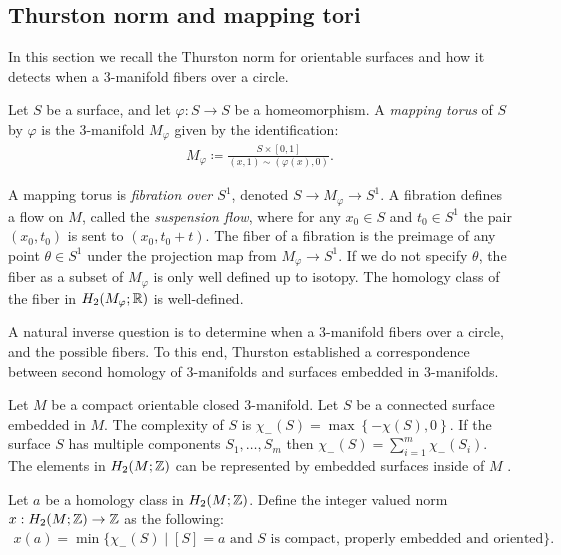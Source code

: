 \subsection{Thurston norm and mapping tori}
\label{sec:backgr-thurst-norm}
In this section we recall the Thurston norm for orientable surfaces and how it detects when a 3-manifold fibers over a circle.

 Let $S$ be a surface, and let $\varphi: S \to S$ be a homeomorphism.  A {\it mapping torus} of $S$ by $\varphi$ is the $3$-manifold $M_\varphi$ given by the identification:
\begin{align*}
  M_\varphi \coloneqq \frac{S \times [0,1]}{(x,1) \sim (\varphi(x), 0)}.
\end{align*}

A mapping torus is \emph{fibration over $S^1$}, denoted $S\rightarrow M_\varphi\rightarrow S^1$.
A fibration defines a flow on $M$, called the \emph{suspension flow}, where for any $x_0\in S$ and $t_0\in S^1$ the pair $(x_0,t_0)$ is sent to $(x_0,t_0+t)$.
The fiber of a fibration is the preimage of any point $\theta \in S^1$ under the projection map from $M_{\varphi} \to S^1$.
If we do not specify $\theta$, the fiber as a subset of $M_\varphi$ is only well defined up to isotopy.   The homology class of the fiber in $H_2(M_{\varphi}; \mathbb{R})$ is well-defined.

A natural inverse question is to determine when a 3-manifold fibers over a circle, and the possible fibers.  To this end, Thurston established a correspondence between second homology of 3-manifolds and surfaces embedded in 3-manifolds.

 Let $M$ be a compact orientable closed $3$-manifold.
Let $S$ be a connected surface embedded in $M$.  The complexity of $S$ is $\chi_-(S) = \max\left\{-\chi(S),0\right\}$.
If the surface $S$ has multiple components $S_1, \ldots, S_m$ then $\chi_-(S) = \displaystyle\sum_{i=1}^m\chi_-(S_i)$.
The elements in $H_2(M ; \mathbb{Z})$ can be represented by embedded surfaces inside of $M$ \cite[Lemma 1]{thurston1986norm}.


 Let $a$ be a homology class in $H_2(M; \mathbb{Z})$.  Define the integer valued norm $x:H_2(M;\mathbb{Z})\rightarrow \mathbb{Z}$ as the following:
\begin{align*}
  x(a) = \min\{\chi_-(S) \mid [S] = a \text{ and $S$ is compact, properly embedded and oriented}\}.
\end{align*}

